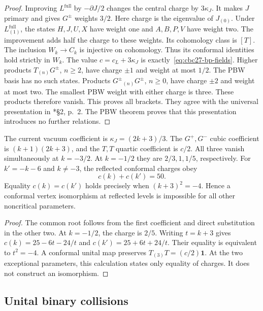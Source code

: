 \begin{proof}
Improving $L^{\mathrm{full}}$ by $-\partial J/2$ changes the central charge by $3\kappa_J$.
It makes $J$ primary and gives $G^\pm$ weights $3/2$.
Here charge is the eigenvalue of $J_{(0)}$.
Under $L^{\mathrm{full}}_{(1)}$, the states $H,J,U,X$ have weight one and $A,B,P,V$ have weight two.
The improvement adds half the charge to these weights.
Its cohomology class is $[T]$.
The inclusion $W_k\to C_k$ is injective on cohomology.
Thus its conformal identities hold strictly in $W_k$.
The value $c=c_L+3\kappa_J$ is exactly~\eqref{eq:cbc27-bp-fields}.
Higher products $T_{(n)}G^\pm$, $n\geq2$, have charge $\pm1$ and weight at most $1/2$.
The PBW basis has no such states.
Products $G^\pm{}_{(n)}G^\pm$, $n\geq0$, have charge $\pm2$ and weight at most two.
The smallest PBW weight with either charge is three.
These products therefore vanish.
This proves all brackets.
They agree with the universal presentation in
\cite{SubregularArakawa027}*{\S2, p.~2}.
The PBW theorem proves that this presentation introduces no further relations.
\end{proof}

\begin{corollary}\label{cor:cbc27-bp-levels}
The current vacuum coefficient is $\kappa_J=(2k+3)/3$.
The $G^+,G^-$ cubic coefficient is $(k+1)(2k+3)$, and the $T,T$ quartic coefficient is $c/2$.
All three vanish simultaneously at $k=-3/2$.
At $k=-1/2$ they are $2/3,1,1/5$, respectively.
For $k'=-k-6$ and $k\ne-3$, the reflected conformal charges obey
\[
 c(k)+c(k')=50.
\]
Equality $c(k)=c(k')$ holds precisely when $(k+3)^2=-4$.
Hence a conformal vertex isomorphism at reflected levels is impossible for all other noncritical parameters.
\end{corollary}
\begin{proof}
The common root follows from the first coefficient and direct substitution in the other two.
At $k=-1/2$, the charge is $2/5$.
Writing $t=k+3$ gives $c(k)=25-6t-24/t$ and $c(k')=25+6t+24/t$.
Their equality is equivalent to $t^2=-4$.
A conformal unital map preserves $T_{(3)}T=(c/2)\mathbf1$.
At the two exceptional parameters, this calculation states only equality of charges.
It does not construct an isomorphism.
\end{proof}

\subsection{Unital binary collisions}

